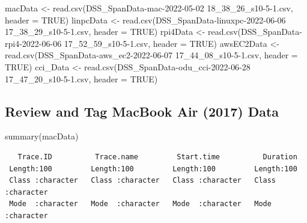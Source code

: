 \documentclass[
  letterpaper,
  DIV=11,
  numbers=noendperiod]{scrartcl}
\newenvironment{Shaded}{\begin{snugshade}}{\end{snugshade}}
\newcommand{\AttributeTok}[1]{\textcolor[rgb]{0.40,0.45,0.13}{#1}}
\newcommand{\ConstantTok}[1]{\textcolor[rgb]{0.56,0.35,0.01}{#1}}
\newcommand{\FunctionTok}[1]{\textcolor[rgb]{0.28,0.35,0.67}{#1}}
\newcommand{\NormalTok}[1]{\textcolor[rgb]{0.00,0.23,0.31}{#1}}
\newcommand{\OtherTok}[1]{\textcolor[rgb]{0.00,0.23,0.31}{#1}}
\newcommand{\StringTok}[1]{\textcolor[rgb]{0.13,0.47,0.30}{#1}}
\begin{document}
\begin{Shaded}
\begin{Highlighting}[]
\NormalTok{macData }\OtherTok{\textless{}{-}} \FunctionTok{read.csv}\NormalTok{(}\StringTok{\textquotesingle{}DSS\_SpanData{-}mac{-}2022{-}05{-}02 18\_38\_26\_s10{-}5{-}1.csv\textquotesingle{}}\NormalTok{, }\AttributeTok{header =} \ConstantTok{TRUE}\NormalTok{)}
\NormalTok{linpcData }\OtherTok{\textless{}{-}} \FunctionTok{read.csv}\NormalTok{(}\StringTok{\textquotesingle{}DSS\_SpanData{-}linuxpc{-}2022{-}06{-}06 17\_38\_29\_s10{-}5{-}1.csv\textquotesingle{}}\NormalTok{, }\AttributeTok{header =} \ConstantTok{TRUE}\NormalTok{)}
\NormalTok{rpi4Data }\OtherTok{\textless{}{-}} \FunctionTok{read.csv}\NormalTok{(}\StringTok{\textquotesingle{}DSS\_SpanData{-}rpi4{-}2022{-}06{-}06 17\_52\_59\_s10{-}5{-}1.csv\textquotesingle{}}\NormalTok{, }\AttributeTok{header =} \ConstantTok{TRUE}\NormalTok{)}
\NormalTok{awsEC2Data }\OtherTok{\textless{}{-}} \FunctionTok{read.csv}\NormalTok{(}\StringTok{\textquotesingle{}DSS\_SpanData{-}aws\_ec2{-}2022{-}06{-}07 17\_44\_08\_s10{-}5{-}1.csv\textquotesingle{}}\NormalTok{, }\AttributeTok{header =} \ConstantTok{TRUE}\NormalTok{)}
\NormalTok{cci\_Data }\OtherTok{\textless{}{-}} \FunctionTok{read.csv}\NormalTok{(}\StringTok{\textquotesingle{}DSS\_SpanData{-}odu\_cci{-}2022{-}06{-}28 17\_47\_20\_s10{-}5{-}1.csv\textquotesingle{}}\NormalTok{, }\AttributeTok{header =} \ConstantTok{TRUE}\NormalTok{)}
\end{Highlighting}
\end{Shaded}

\hypertarget{review-and-tag-macbook-air-2017-data}{%
\subsection{Review and Tag MacBook Air (2017)
Data}\label{review-and-tag-macbook-air-2017-data}}

\begin{Shaded}
\begin{Highlighting}[]
\FunctionTok{summary}\NormalTok{(macData)}
\end{Highlighting}
\end{Shaded}

\begin{verbatim}
   Trace.ID          Trace.name         Start.time          Duration        
 Length:100         Length:100         Length:100         Length:100        
 Class :character   Class :character   Class :character   Class :character  
 Mode  :character   Mode  :character   Mode  :character   Mode  :character  
\end{verbatim}
\end{document}
